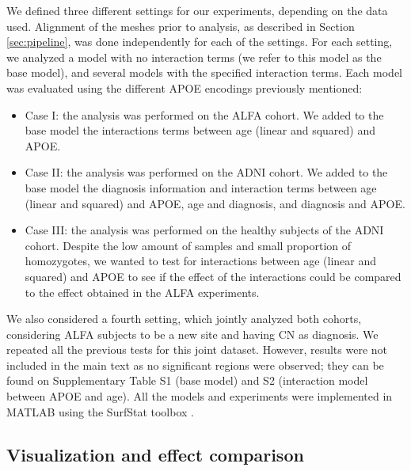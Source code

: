 We defined three different settings for our experiments, depending on the data used. Alignment of the meshes prior to analysis, as described in Section \ref{sec:pipeline}, was done independently for each of the settings. For each setting, we analyzed a model with no interaction terms (we refer to this model as the base model), and several models with the specified interaction terms. Each model was evaluated using the different APOE encodings previously mentioned:

\begin{itemize}
    \item Case I: the analysis was performed on the ALFA cohort. We added to the base model the interactions terms between age (linear and squared) and APOE. 
    \item Case II: the analysis was performed on the ADNI cohort. We added to the base model the diagnosis information and interaction terms between age (linear and squared) and APOE, age and diagnosis, and diagnosis and APOE.
    \item Case III: the analysis was performed on the healthy subjects of the ADNI cohort. Despite the low amount of samples and small proportion of homozygotes, we wanted to test for interactions between age (linear and squared) and APOE to see if the effect of the interactions could be compared to the effect obtained in the ALFA experiments.
\end{itemize}

We also considered a fourth setting, which jointly analyzed both cohorts, considering ALFA subjects to be a new site and having CN as diagnosis. We repeated all the previous tests for this joint dataset. However, results were not included in the main text as no significant regions were observed; they can be found on Supplementary Table S1 (base model) and S2 (interaction model between APOE and age). All the models and experiments were implemented in MATLAB using the SurfStat toolbox \cite{Worsley2009}.\\ 

\subsection{Visualization and effect comparison}
\label{sec:visualization}

